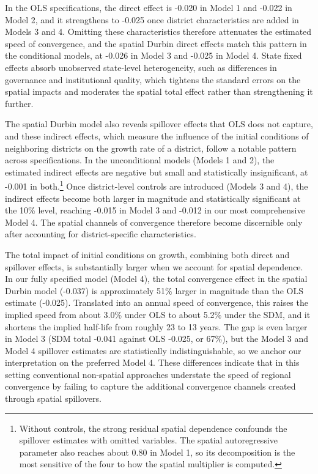 \documentclass[
  a4paper, 
  twoside,
  final
]{article}
\begin{document}
\endgroup

In the OLS specifications, the direct effect is -0.020 in Model 1 and
-0.022 in Model 2, and it strengthens to -0.025 once district
characteristics are added in Models 3 and 4. Omitting these
characteristics therefore attenuates the estimated speed of convergence,
and the spatial Durbin direct effects match this pattern in the
conditional models, at -0.026 in Model 3 and -0.025 in Model 4. State
fixed effects absorb unobserved state-level heterogeneity, such as
differences in governance and institutional quality, which tightens the
standard errors on the spatial impacts and moderates the spatial total
effect rather than strengthening it further.

The spatial Durbin model also reveals spillover effects that OLS does
not capture, and these indirect effects, which measure the influence of
the initial conditions of neighboring districts on the growth rate of a
district, follow a notable pattern across specifications. In the
unconditional models (Models 1 and 2), the estimated indirect effects
are negative but small and statistically insignificant, at -0.001 in
both.\footnote{Without controls, the strong residual spatial dependence
  confounds the spillover estimates with omitted variables. The spatial
  autoregressive parameter also reaches about 0.80 in Model 1, so its
  decomposition is the most sensitive of the four to how the spatial
  multiplier is computed.} Once district-level controls are introduced
(Models 3 and 4), the indirect effects become both larger in magnitude
and statistically significant at the 10\% level, reaching -0.015 in
Model 3 and -0.012 in our most comprehensive Model 4. The spatial
channels of convergence therefore become discernible only after
accounting for district-specific characteristics.

The total impact of initial conditions on growth, combining both direct
and spillover effects, is substantially larger when we account for
spatial dependence. In our fully specified model (Model 4), the total
convergence effect in the spatial Durbin model (-0.037) is approximately
51\% larger in magnitude than the OLS estimate (-0.025). Translated into
an annual speed of convergence, this raises the implied speed from about
3.0\% under OLS to about 5.2\% under the SDM, and it shortens the
implied half-life from roughly 23 to 13 years. The gap is even larger in
Model 3 (SDM total -0.041 against OLS -0.025, or 67\%), but the Model 3
and Model 4 spillover estimates are statistically indistinguishable, so
we anchor our interpretation on the preferred Model 4. These differences
indicate that in this setting conventional non-spatial approaches
understate the speed of regional convergence by failing to capture the
additional convergence channels created through spatial spillovers.
\end{document}

